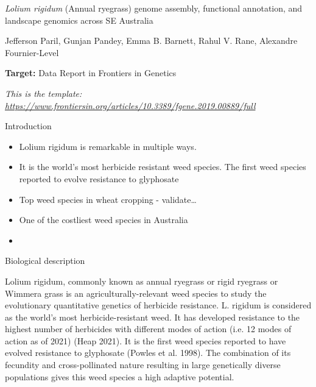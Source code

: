 \protect\hypertarget{anchor}{}{}\emph{Lolium rigidum} (Annual ryegrass)
genome assembly, functional annotation, and landscape genomics across SE
Australia

Jefferson Paril, Gunjan Pandey, Emma B. Barnett, Rahul V. Rane,
Alexandre Fournier-Level

\textbf{Target:} Data Report in Frontiers in Genetics

\emph{This is the template:
}\href{https://www.frontiersin.org/articles/10.3389/fgene.2019.00889/full}{\emph{https://www.frontiersin.org/articles/10.3389/fgene.2019.00889/full}}

\protect\hypertarget{anchor-1}{}{}Introduction

\begin{itemize}
\tightlist
\item
  Lolium rigidum is remarkable in multiple ways.
\item
  It is the world's most herbicide resistant weed species. The first
  weed species reported to evolve resistance to glyphosate
\item
  Top weed species in wheat cropping - validate\ldots{}
\item
  One of the costliest weed species in Australia
\item
\end{itemize}

\protect\hypertarget{anchor-2}{}{}Biological description

Lolium rigidum, commonly known as annual ryegrass or rigid ryegrass or
Wimmera grass is an agriculturally-relevant weed species to study the
evolutionary quantitative genetics of herbicide resistance. L. rigidum
is considered as the world's most herbicide-resistant weed. It has
developed resistance to the highest number of herbicides with different
modes of action (i.e. 12 modes of action as of 2021) (Heap 2021). It is
the first weed species reported to have evolved resistance to glyphosate
(Powles et al. 1998). The combination of its fecundity and
cross-pollinated nature resulting in large genetically diverse
populations gives this weed species a high adaptive potential.

